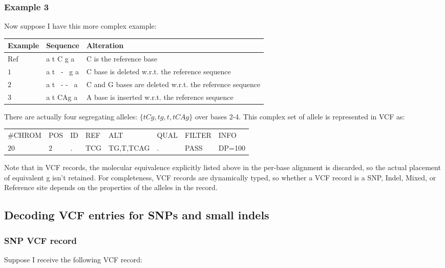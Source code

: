 \documentclass[8pt]{article}
\begin{document}
\subsubsection{Example 3}
Now suppose I have this more complex example:

\vspace{0.3cm}
\begin{tabular}{ | l | l | l | }
\hline
Example & Sequence & Alteration \\ \hline
Ref & a t C g a & C is the reference base \\ \hline
$1$   & a t \ - \ g a & C base is deleted w.r.t. the reference sequence \\ \hline
$2$   & a t \ - - \ a & C and G bases are deleted w.r.t. the reference sequence\\ \hline
$3$   & a t CAg a & A base is inserted w.r.t. the reference sequence \\ \hline
\end{tabular}

\vspace{0.3cm}
There are actually four segregating alleles: $\{tCg,tg,t,tCAg\}$ over bases 2-4. This complex set of allele is represented in VCF as:

\vspace{0.3cm}
\begin{tabular}{ l l l l l l l l}
	\#CHROM & POS & ID & REF & ALT & QUAL & FILTER & INFO \\
	$20$ & $2$ & . & TCG & TG,T,TCAG & . & PASS & DP=100 \\
\end{tabular}
\vspace{0.3cm}

Note that in VCF records, the molecular equivalence explicitly listed above in the per-base alignment is discarded, so the actual placement of equivalent g isn't retained. For completeness, VCF records are dynamically typed, so whether a VCF record is a SNP, Indel, Mixed, or Reference site depends on the properties of the alleles in the record.

\subsection{Decoding VCF entries for SNPs and small indels}
\subsubsection{SNP VCF record}
Suppose I receive the following VCF record:
\end{document}
